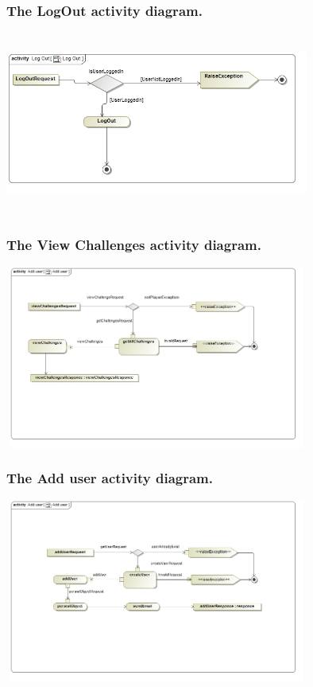 \documentclass[english]{article}
\begin{document}
		\subsubsection* {The LogOut activity diagram.}
		\includegraphics[width=10cm,height=6cm,keepaspectratio]{LogOut.jpg}	
		
			\subsubsection* {The View Challenges activity diagram.}
			\includegraphics[width=10cm,height=6cm,keepaspectratio]{ViewChallenges.jpg}	
		
		 \subsubsection* {The Add user activity diagram.}
		 \includegraphics[width=10cm,height=6cm,keepaspectratio]{addUser1.jpg}	
		 
\end{document}
